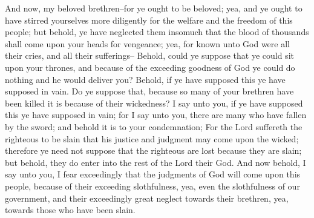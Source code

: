 And now, my beloved brethren--for ye ought to be beloved; yea, and ye ought to have stirred yourselves more diligently for the welfare and the freedom of this people; but behold, ye have neglected them insomuch that the blood of thousands shall come upon your heads for vengeance; yea, for known unto God were all their cries, and all their sufferings--
\bverse \iffalse Behold, could ye suppose that ye could sit upon your thrones, and because of the exceeding goodness of God ye could do nothing and he would deliver you? Behold, if ye have supposed this ye have supposed in vain. \fi
Behold, could ye suppose that ye could sit upon your thrones, and because of the exceeding goodness of God ye could do nothing and he would deliver you? Behold, if ye have supposed this ye have supposed in vain.
\bverse \iffalse Do ye suppose that, because so many of your brethren have been killed it is because of their wickedness? I say unto you, if ye have supposed this ye have supposed in vain; for I say unto you, there are many who have fallen by the sword; and behold it is to your condemnation; \fi
Do ye suppose that, because so many of your brethren have been killed it is because of their wickedness? I say unto you, if ye have supposed this ye have supposed in vain; for I say unto you, there are many who have fallen by the sword; and behold it is to your condemnation;
\bverse \iffalse For the Lord suffereth the righteous to be slain that his justice and judgment may come upon the wicked; therefore ye need not suppose that the righteous are lost because they are slain; but behold, they do enter into the rest of the Lord their God. \fi
For the Lord suffereth the righteous to be slain that his justice and judgment may come upon the wicked; therefore ye need not suppose that the righteous are lost because they are slain; but behold, they do enter into the rest of the Lord their God.
\bverse \iffalse And now behold, I say unto you, I fear exceedingly that the judgments of God will come upon this people, because of their exceeding slothfulness, yea, even the slothfulness of our government, and their exceedingly great neglect towards their brethren, yea, towards those who have been slain. \fi
And now behold, I say unto you, I fear exceedingly that the judgments of God will come upon this people, because of their exceeding slothfulness, yea, even the slothfulness of our government, and their exceedingly great neglect towards their brethren, yea, towards those who have been slain.
\bverse \iffalse For were it not for the wickedness which first commenced at our head, we could have withstood our enemies that they could have gained no power over us. \fi
